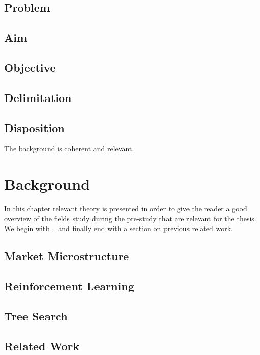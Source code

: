 \documentclass{kththesis}
\theoremstyle{definition}
\begin{document}
 



\section{Problem}

\section{Aim}

\section{Objective}

\section{Delimitation}

\section{Disposition}


The background is coherent and relevant.
\chapter{Background}
In this chapter relevant theory is presented in order to give the reader a good overview of the fields study during the pre-study that are relevant for the thesis. We begin with .. and finally end with a section on previous related work.

\section{Market Microstructure}

\section{Reinforcement Learning}

\section{Tree Search}

\section{Related Work}
\end{document}
